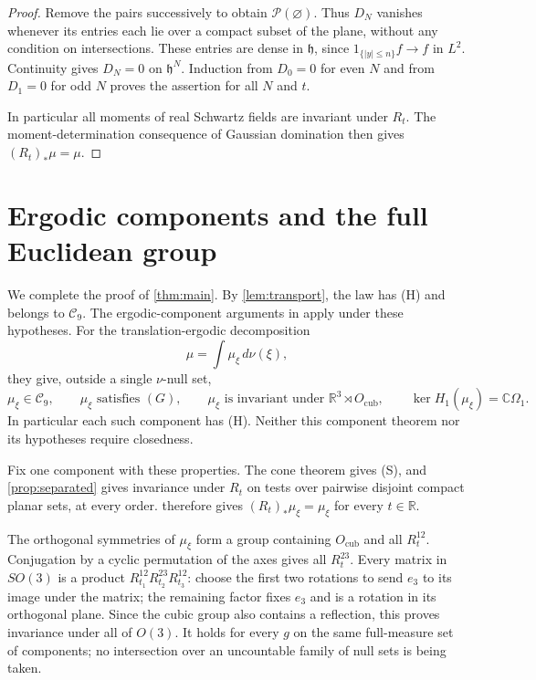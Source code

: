 \documentclass[11pt,letterpaper,reqno]{amsart}
\theoremstyle{definition}
\theoremstyle{remark}
\newcommand{\R}{\mathbb R}\newcommand{\C}{\mathbb C}
\newcommand{\Ocub}{O_{\mathrm{cub}}}
\begin{document}
\begin{proof}
Remove the pairs successively to obtain $\mathcal P(\varnothing)$.
Thus $D_N$ vanishes whenever its entries each lie over a compact subset
of the plane, without any condition on intersections. These entries are
dense in $\mathfrak h$, since $1_{\{|y|\le n\}}f\to f$ in $L^2$.
Continuity gives $D_N=0$ on $\mathfrak h^N$.
Induction from $D_0=0$ for even $N$ and from $D_1=0$ for odd $N$ proves
the assertion for all $N$ and $t$.

In particular all moments of real Schwartz fields are invariant under
$R_t$. The moment-determination consequence of Gaussian domination then
gives $(R_t)_*\mu=\mu$.
\end{proof}



\section{Ergodic components and the full Euclidean group}\label{sec:components}

We complete the proof of \cref{thm:main}. By
\cref{lem:transport}, the law has (H) and belongs to $\mathcal C_9$.
The ergodic-component arguments in
\cite[Sections~7.3--7.5]{QEDCurrent} apply under these hypotheses.
For the translation-ergodic decomposition
\[
 \mu=\int\mu_\xi\,d\nu(\xi),
\]
they give, outside a single $\nu$-null set,
\begin{equation}\label{eq:components}
 \mu_\xi\in\mathcal C_9,\qquad
 \mu_\xi\text{ satisfies }(G),\qquad
 \mu_\xi\text{ is invariant under }\R^3\rtimes\Ocub,\qquad
 \ker H_1(\mu_\xi)=\C\Omega_1.
\end{equation}
In particular each such component has (H). Neither this component
theorem nor its hypotheses require closedness.

Fix one component with these properties. The cone theorem gives (S),
and \cref{prop:separated} gives invariance under $R_t$ on
tests over pairwise disjoint compact planar sets, at every order.
 therefore gives
$(R_t)_*\mu_\xi=\mu_\xi$ for every $t\in\R$.

The orthogonal symmetries of $\mu_\xi$ form a group containing
$\Ocub$ and all $R^{12}_t$. Conjugation by a cyclic permutation of
the axes gives all $R^{23}_t$. Every matrix in $SO(3)$ is a product
$R^{12}_{t_1}R^{23}_{t_2}R^{12}_{t_3}$: choose the first two rotations
to send $e_3$ to its image under the matrix; the remaining factor
fixes $e_3$ and is a rotation in its orthogonal plane. Since the cubic
group also contains a reflection, this proves invariance under all
of $O(3)$. It holds for every $g$ on the same full-measure set of
components; no intersection over an uncountable family of null sets
is being taken.
\end{document}
